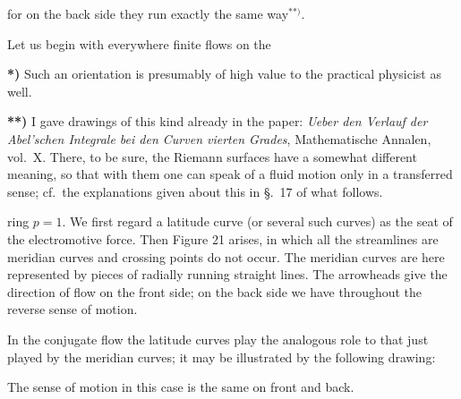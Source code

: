\documentclass{article}
\begin{document}

for on the back side they run exactly the same way${}^{**)}$.

Let us begin with everywhere finite flows on the

\textbf{*)} Such an orientation is presumably of high value to the practical physicist as well.

\textbf{**)} I gave drawings of this kind already in the paper: \emph{Ueber den Verlauf der Abel'schen Integrale bei den Curven vierten Grades}, Mathematische Annalen, vol.~X. There, to be sure, the Riemann surfaces have a somewhat different meaning, so that with them one can speak of a fluid motion only in a transferred sense; cf.\ the explanations given about this in §.~17 of what follows.

ring $p = 1$. We first regard a latitude curve (or several such curves) as the seat of the electromotive force. Then Figure 21 arises, in which all the streamlines are meridian curves and crossing points do not occur. The meridian curves are here represented by pieces of radially running straight lines. The arrowheads give the direction of flow on the front side; on the back side we have throughout the reverse sense of motion.

In the conjugate flow the latitude curves play the analogous role to that just played by the meridian curves; it may be illustrated by the following drawing:


The sense of motion in this case is the same on front and back.

\end{document}
